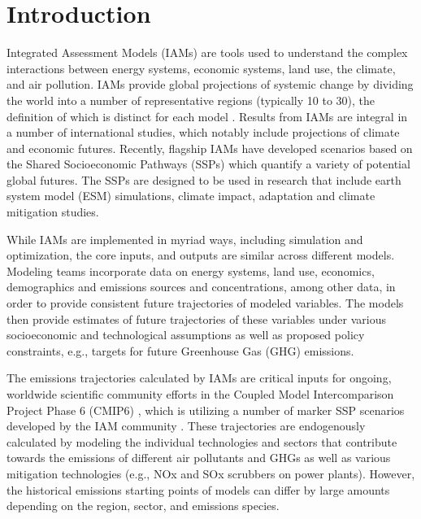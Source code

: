 \section{Introduction}

Integrated Assessment Models (IAMs) are tools used to understand the complex
interactions between energy systems, economic systems, land use, the climate,
and air pollution. IAMs provide global projections of
systemic change by dividing the world into a number of representative regions
(typically 10 to 30), the definition of which is distinct for each model
\cite{krey_global_2014}. Results from IAMs are integral in a number of
international studies, which notably include projections of climate and economic
futures. Recently, flagship IAMs have developed scenarios based on the Shared
% 
% 
Socioeconomic Pathways (SSPs) \cite{van_vuuren_energy_2017, fricko_marker_2017,
  fujimori_ssp3:_2017, calvin_ssp4:_2017, kriegler_fossil-fueled_2017} which
quantify a variety of potential global futures. The SSPs are  designed
to be used in  research that include earth system
model (ESM) simulations, climate impact, adaptation and climate mitigation
studies. 

While IAMs are implemented in myriad ways, including simulation and
optimization, the core inputs, and outputs  are similar across different
models. Modeling teams incorporate  data on energy systems, land
use, economics, demographics and emissions sources and concentrations, among other
data, in order to provide consistent future trajectories of modeled
variables. The models then provide estimates of future trajectories of these
variables under various socioeconomic and technological assumptions as well as
proposed policy constraints, e.g., targets for future Greenhouse Gas (GHG)
emissions.

The emissions trajectories calculated by IAMs are critical inputs for ongoing,
worldwide scientific community efforts in the Coupled Model Intercomparison
Project Phase 6 (CMIP6) \cite{eyring_overview_2016}, which is utilizing a number
of marker SSP scenarios developed by the IAM community
\cite{oneill_scenario_2016}. These trajectories are endogenously calculated by
modeling the individual technologies and sectors that contribute towards the
emissions of different air pollutants and GHGs as well as various mitigation
technologies (e.g., NOx and SOx scrubbers on power plants). However, the
% 
% 
historical emissions starting points of  models can differ by
large amounts depending on the region, sector, and emissions species.

